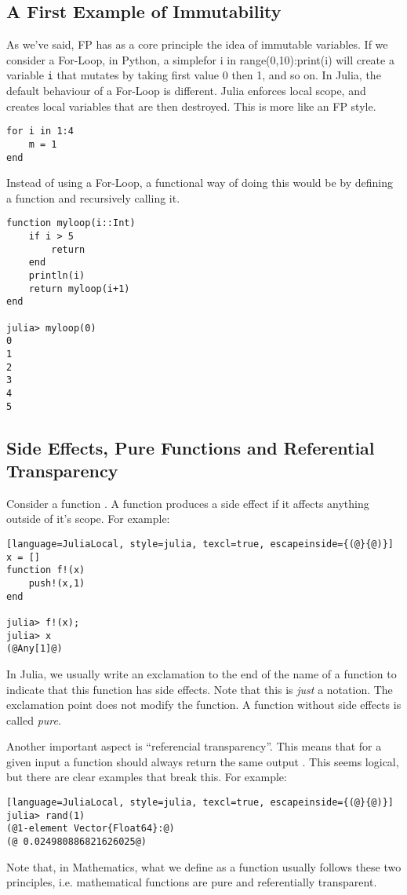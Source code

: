 \subsection{A First Example of Immutability}

As we've said, FP has as a core principle the idea of immutable variables.
If we consider a For-Loop, in Python, a simple\lstinline[style=julia]{}\lstinline[style=julia]{}for i in range(0,10):print(i)\lstinline[style=julia]{}\lstinline[style=julia]{}
will create a variable \lstinline[style=julia]{i} that mutates by taking first value 0 then 1, and so on.
In Julia, the default behaviour of a For-Loop is different. Julia enforces local scope,
and creates local variables that are then destroyed. This is more like an FP style.
\bigskip
\begin{lstlisting}[language=JuliaLocal, style=julia, texcl=false]
for i in 1:4
    m = 1
end
\end{lstlisting}
Instead of using a For-Loop, a functional way of doing this would be by defining a function and recursively calling it.
\bigskip
\begin{lstlisting}[language=JuliaLocal, style=julia, texcl=true]
function myloop(i::Int)
    if i > 5
        return
    end
    println(i)
    return myloop(i+1)
end

julia> myloop(0)
0
1
2
3
4
5
\end{lstlisting}

\subsection{Side Effects, Pure Functions and Referential Transparency}

Consider a function . A function produces a side effect if it affects anything outside of it's scope. For example:
\bigskip
\begin{lstlisting}[language=JuliaLocal, style=julia, texcl=true, escapeinside={(@}{@)}]
x = []
function f!(x)
    push!(x,1)
end

julia> f!(x);
julia> x
(@Any[1]@)
\end{lstlisting}

In Julia, we usually write an exclamation to the end of the name of a function
to indicate that this function has side effects.
Note that this is \textit{just} a notation.
The exclamation point does not modify the function.
A function without side effects is called \textit{pure}.

Another important aspect is ``referencial transparency''.
This means that for a given input  a function should always return the same output .
This seems logical, but there are clear examples that break this. For example:
\bigskip
\begin{lstlisting}[language=JuliaLocal, style=julia, texcl=true, escapeinside={(@}{@)}]
julia> rand(1)
(@1-element Vector{Float64}:@)
(@ 0.024980886821626025@)
\end{lstlisting}
Note that, in Mathematics,
what we define as a function usually follows these two principles,
i.e. mathematical functions are pure and referentially transparent.

